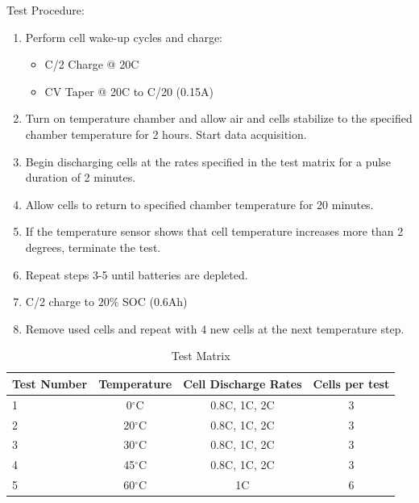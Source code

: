 \documentclass[]{aiaa-tc}%
\begin{document}
Test Procedure:
\begin{enumerate}
\item Perform cell wake-up cycles and charge:
    \begin{itemize}
        \item C/2 Charge @ 20C
        \item CV Taper @ 20C to C/20 (0.15A)
    \end{itemize}
\item Turn on temperature chamber and allow air and cells stabilize to the specified chamber temperature for 2 hours. Start data acquisition.
\item  Begin discharging cells at the rates specified in the test matrix for a pulse duration of 2 minutes.
\item Allow cells to return to specified chamber temperature for 20 minutes.
\item If the temperature sensor shows that cell temperature increases more than 2 degrees, terminate the test.
\item Repeat steps 3-5 until batteries are depleted.
\item C/2 charge to $20\%$ SOC (0.6Ah)
\item Remove used cells and repeat with 4 new cells at the next temperature step.
\end{enumerate}



\begin{table}[ht]
\begin{center}
\begin{tabular}{|l|c|c|c|}
\hline
 \multicolumn{1}{|c|}{\textbf{Test Number}} &
 \multicolumn{1}{c|}{\textbf{Temperature}} & 
 \multicolumn{1}{c|}{\textbf{Cell Discharge Rates}} &
 \multicolumn{1}{c|}{\textbf{Cells per test}} \\ 
\hline
\rowcolor{LightCyan}
1  & 0$^\circ$C & 0.8C, 1C, 2C & 3 \\
2  & 20$^\circ$C & 0.8C, 1C, 2C & 3 \\
\rowcolor{LightCyan}
3  & 30$^\circ$C & 0.8C, 1C, 2C & 3 \\
4  & 45$^\circ$C & 0.8C, 1C, 2C & 3 \\
\rowcolor{LightCyan}
5  & 60$^\circ$C & 1C & 6 \\

\hline
\end{tabular}
\end{center}
\label{tab:battTestM}
\caption{Test Matrix}
\end{table}
\end{document}
